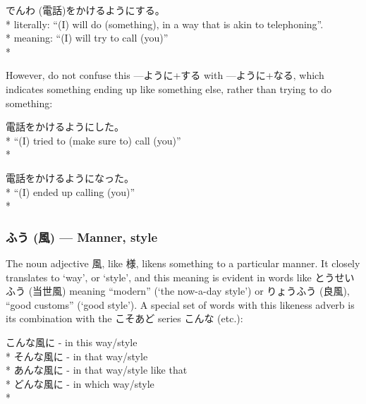 \documentclass[11pt, b5paper, twoside, openright, onecolumn]{book}
\makeatletter
\newcommand*{\rubystack}[2]{{\relscale{0.5}%
  \begin{tabular}[b]{@{}c@{}}%
    {#1}\\%
   {\textscale{2}{#2}}%
  \end{tabular}}%
}
\DeclareRobustCommand*{\ruby}[2]{%
  \mbox{%
    \setlength{\parskip}{0ex}%
    \BeginAccSupp{method=pdfstringdef,ActualText={#1}}%
      \rubystack{\phantom{#2}}{#1}%
      \llap{%
        \rubystack{#2}{\phantom{#1}}%
      }%
    \EndAccSupp{}%
  }%
}
\renewcommand*{\ruby}[2]{#2 (#1)}%
\newenvironment{exampleblock}{
\setlength{\parindent}{0.6in}
\begin{minipage}[t]{\dimexpr\textwidth-\parindent}}
{\end{minipage}}
\makeatother
\begin{document}
\vspace{0.4cm}
\begin{exampleblock}
\ruby{電話}{でんわ}をかけるようにする。 \\* 
literally: “(I) will do (something)‚ in a way that is akin to telephoning”. \\* 
meaning: “(I) will try to call (you)” \\* 
\end{exampleblock}
\vspace{0.2cm}

However‚ do not confuse this —ように+する with —ように+なる‚ which indicates something ending up like something else‚ rather than trying to do something:

\vspace{0.4cm}
\begin{exampleblock}
電話をかけるようにした。 \\* 
“(I) tried to (make sure to) call (you)” \\* 
\end{exampleblock}
\vspace{0.2cm}

\begin{exampleblock}
電話をかけるようになった。 \\* 
“(I) ended up calling (you)” \\* 
\end{exampleblock}
\subsubsection{\ruby{風}{ふう} — Manner‚ style}


The noun adjective 風‚ like 様‚ likens something to a particular manner. It closely translates to ‘way’‚ or ‘style’‚ and this meaning is evident in words like \ruby{当世風}{とうせいふう} meaning “modern” (‘the now-a-day style’) or \ruby{良風}{りょうふう}‚ “good customs” (‘good style’). A special set of words with this likeness adverb is its combination with the こそあど series こんな (etc.):

\vspace{0.4cm}
\begin{exampleblock}
こんな風に - in this way/style \\* 
そんな風に - in that way/style \\* 
あんな風に - in that way/style like that \\* 
どんな風に - in which way/style \\* 
\end{exampleblock}
\vspace{0.2cm}
\end{document}
